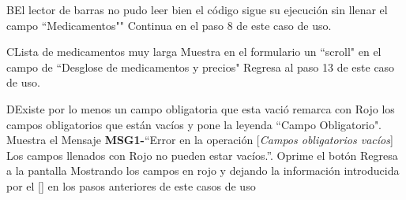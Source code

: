 		\begin{UCtrayectoriaA}{B}{El lector de barras no pudo leer bien el código}
			\UCpaso sigue su ejecución sin llenar el campo ``Medicamentos""
			\UCpaso Continua en el paso 8 de este caso de uso.	
		\end{UCtrayectoriaA}
		\begin{UCtrayectoriaA}{C}{Lista de medicamentos muy larga }
			\UCpaso Muestra en el formulario  un 					``scroll" en el campo de ``Desglose de medicamentos y precios"
			\UCpaso Regresa al paso 13 de este caso de uso.
		\end{UCtrayectoriaA}		
			\begin{UCtrayectoriaA}{D}{Existe por lo menos un campo obligatoria que esta vació}
			\UCpaso remarca con Rojo los campos obligatorios que están vacíos 
			y pone la leyenda ``Campo Obligatorio".
			\UCpaso Muestra el Mensaje {\bf MSG1-}``Error en la operación [{\em Campos obligatorios vacíos}] Los campos llenados con Rojo no pueden estar vacíos.''.
			\UCpaso[\UCactor] Oprime el botón 
			\UCpaso Regresa a la pantalla  Mostrando los campos en rojo y dejando la información introducida por el [\UCactor] en los pasos anteriores de este casos de uso
		\end{UCtrayectoriaA}
